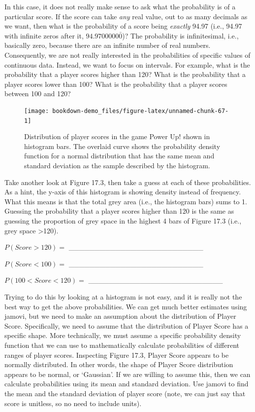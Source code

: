 \documentclass[
  openany]{scrbook}
\begin{document}
In this case, it does not really make sense to ask what the probability is of a particular score.
If the score can take \emph{any} real value, out to as many decimals as we want, then what is the probability of a score being \emph{exactly} 94.97 (i.e., 94.97 with infinite zeros after it, \(94.9700000\bar{0}\))?
The probability is infinitesimal, i.e., basically zero, because there are an infinite number of real numbers.
Consequently, we are not really interested in the probabilities of specific values of continuous data.
Instead, we want to focus on intervals.
For example, what is the probability that a player scores higher than 120?
What is the probability that a player scores lower than 100?
What is the probability that a player scores between 100 and 120?

\begin{figure}
\texttt{[image: bookdown-demo\_files/figure-latex/unnamed-chunk-67-1]} \caption{Distribution of player scores in the game Power Up! shown in histogram bars. The overlaid curve shows the probability density function for a normal distribution that has the same mean and standard deviation as the sample described by the histogram.}\label{fig:unnamed-chunk-67}
\end{figure}

Take another look at Figure 17.3, then take a guess at each of these probabilities.
As a hint, the y-axis of this histogram is showing density instead of frequency.
What this means is that the total grey area (i.e., the histogram bars) sums to 1.
Guessing the probability that a player scores higher than 120 is the same as guessing the proportion of grey space in the highest 4 bars of Figure 17.3 (i.e., grey space \textgreater120).

\(P(Score>120) =\) \_\_\_\_\_\_\_\_\_\_\_\_\_\_\_\_\_\_\_\_\_\_\_\_\_\_

\(P(Score<100) =\) \_\_\_\_\_\_\_\_\_\_\_\_\_\_\_\_\_\_\_\_\_\_\_\_\_\_

\(P(100<Score<120) =\) \_\_\_\_\_\_\_\_\_\_\_\_\_\_\_\_\_\_\_\_\_\_\_\_\_\_

Trying to do this by looking at a histogram is not easy, and it is really not the best way to get the above probabilities.
We can get much better estimates using jamovi, but we need to make an assumption about the distribution of Player Score.
Specifically, we need to assume that the distribution of Player Score has a specific shape.
More technically, we must assume a specific probability density function that we can use to mathematically calculate probabilities of different ranges of player scores.
Inspecting Figure 17.3, Player Score appears to be normally distributed.
In other words, the shape of Player Score distribution appears to be normal, or `Gaussian'.
If we are willing to assume this, then we can calculate probabilities using its mean and standard deviation.
Use jamovi to find the mean and the standard deviation of player score (note, we can just say that score is unitless, so no need to include units).
\end{document}
